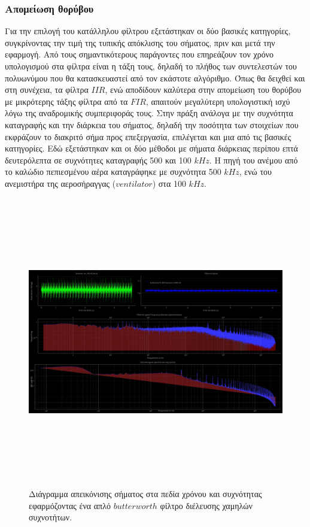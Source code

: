 \documentclass[breaklines=true, 12pt]{article}
\begin{document}
\subsubsection{Απομείωση θορύβου}
\label{sec:org76e649a}
Για την επιλογή του κατάλληλου φίλτρου εξετάστηκαν οι δύο βασικές
κατηγορίες, συγκρίνοντας την τιμή της τυπικής απόκλισης του σήματος, πριν
και μετά την εφαρμογή.  Από τους σημαντικότερους παράγοντες
που επηρεάζουν τον χρόνο υπολογισμού στα φίλτρα είναι η τάξη τους, δηλαδή
το πλήθος των συντελεστών του πολυωνύμου που θα κατασκευαστεί από τον
εκάστοτε αλγόριθμο. Όπως θα δειχθεί και στη συνέχεια, τα φίλτρα \(IIR\), ενώ
αποδίδουν καλύτερα στην απομείωση του θορύβου με μικρότερης τάξης φίλτρα
από τα \(FIR\), απαιτούν μεγαλύτερη υπολογιστική ισχύ λόγω της αναδρομικής
συμπεριφοράς τους. Στην πράξη ανάλογα με την συχνότητα καταγραφής και
την διάρκεια του σήματος, δηλαδή την ποσότητα των στοιχείων που εκφράζουν
το διακριτό σήμα προς επεξεργασία, επιλέγεται και μια από τις βασικές
κατηγορίες. Εδώ εξετάστηκαν και οι δύο μέθοδοι με σήματα διάρκειας περίπου
επτά δευτερόλεπτα σε συχνότητες καταγραφής 500 και 100 \(kHz\). Η πηγή του
ανέμου από το καλώδιο πεπιεσμένου αέρα καταγράφηκε με συχνότητα 500 \(kHz\),
ενώ του ανεμιστήρα της αεροσήραγγας (\textbf{\(ventilator\)}) στα 100 \(kHz\).

\begin{figure}[htbp]
\centering
\includegraphics[width=450px,height=480px]{./src/sign_overview/butterworth_IIR_low_pass_2000_Hz_Inverter_on_WS_0_.jpg}
\caption{Διάγραμμα απεικόνισης σήματος στα πεδία χρόνου και συχνότητας εφαρμόζοντας ένα απλό \(butterworth\) φίλτρο διέλευσης χαμηλών συχνοτήτων.}
\end{figure}
\end{document}
